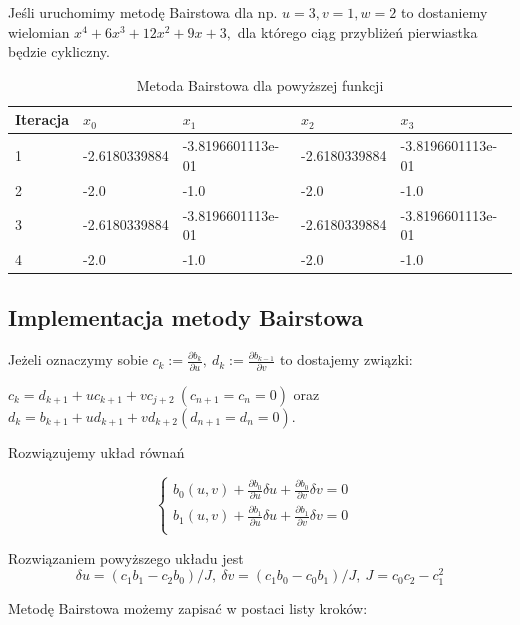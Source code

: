 \documentclass{article}
\begin{document}
Jeśli uruchomimy metodę Bairstowa dla np. $u = 3, v = 1, w = 2$ to dostaniemy wielomian $x^4 + 6x^3 + 12x^2 + 9x +3,$ dla którego ciąg przybliżeń pierwiastka będzie cykliczny.

\begin{table}[h!]
\centering
\caption{Metoda Bairstowa dla powyższej funkcji}
\label{my-label}
\begin{tabular}{|l|l|l|l|l|}
\hline
Iteracja & $x_0$           & $x_1$               & $x_2$           & $x_3$              \\ \hline
1        & -2.6180339884   & -3.8196601113e-01   & -2.6180339884   & -3.8196601113e-01   \\ \hline
2        & -2.0            & -1.0                & -2.0            & -1.0                \\ \hline
3        & -2.6180339884 & -3.8196601113e-01 & -2.6180339884 & -3.8196601113e-01 \\ \hline
4       & -2.0            & -1.0                & -2.0            & -1.0                \\ \hline

\end{tabular}
\end{table}

\subsection{Implementacja metody Bairstowa}

Jeżeli oznaczymy sobie $c_k := \frac{\partial b_k}{\partial u}, \ d_k := \frac{\partial b_{k-1}}{\partial v}$ to dostajemy związki:

$c_k = d_{k+1} + uc_{k+1} + vc_{j+2} \ (c_{n+1} = c_n = 0)$ oraz $d_k = b_{k+1} + u d_{k+1} + v d_{k+2} (d_{n+1} = d_n = 0)$.

Rozwiązujemy układ równań

$$
\left\{\begin{matrix}
b_0(u, v) + \frac{\partial b_0}{\partial u} \delta u + \frac{\partial b_0}{\partial v} \delta v  = 0 & \\ 
b_1(u, v) + \frac{\partial b_1}{\partial u} \delta u + \frac{\partial b_1}{\partial v} \delta v  = 0 & \\ \end{matrix}\right.
$$

Rozwiązaniem powyższego układu jest 
$$\delta u = (c_1b_1 - c_2b_0)/J, \ \delta v = (c_1 b_0 - c_0 b_1)/J, \ J = c_0c_2 - c_1^2$$

Metodę Bairstowa możemy zapisać w postaci listy kroków:
\end{document}
